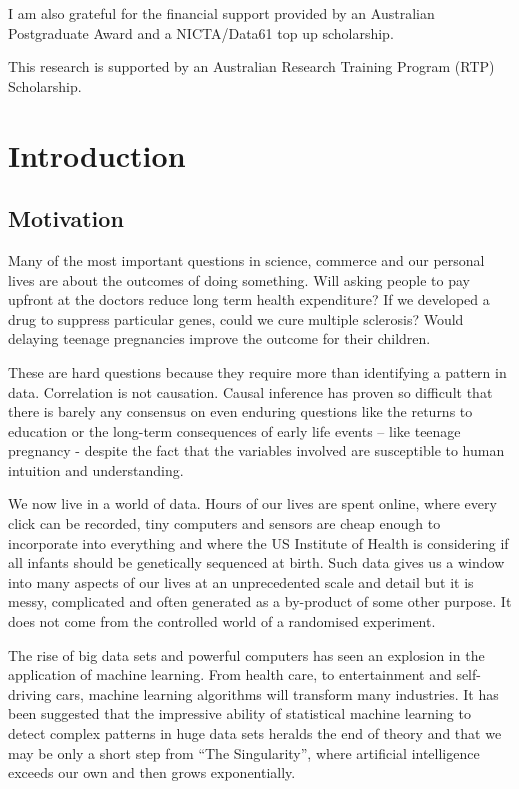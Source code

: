 \documentclass[11pt,a4paper,twoside]{report}
\newcommand{\quotes}[1]{``#1''}
\theoremstyle{plain}
\theoremstyle{definition}
\begin{document}
I am also grateful for the financial support provided by an Australian Postgraduate Award and a NICTA/Data61 top up scholarship. 

This research is supported by an Australian Research Training Program (RTP) Scholarship.

\onehalfspacing
 


\tableofcontents


\chapter{Introduction}

\section{Motivation}
Many of the most important questions in science, commerce and our personal lives are about the outcomes of doing something. Will asking people to pay upfront at the doctors reduce long term health expenditure? If we developed a drug to suppress particular genes, could we cure multiple sclerosis? Would delaying teenage pregnancies improve the outcome for their children.  

These are hard questions because they require more than identifying a pattern in data. Correlation is not causation. Causal inference has proven so difficult that there is barely any consensus on even enduring questions like the returns to education or the long-term consequences of early life events – like teenage pregnancy - despite the fact that the variables involved are susceptible to human intuition and understanding. 

We now live in a world of data. Hours of our lives are spent online, where every click can be recorded, tiny computers and sensors are cheap enough to incorporate into everything and where the US Institute of Health is considering if all infants should be genetically sequenced at birth. Such data gives us a window into many aspects of our lives at an unprecedented scale and detail but it is messy, complicated and often generated as a by-product of some other purpose. It does not come from the controlled world of a randomised experiment.

The rise of big data sets and powerful computers has seen an explosion in the application of machine learning. From health care, to entertainment and self-driving cars, machine learning algorithms will transform many industries. It has been suggested that the impressive ability of statistical machine learning to detect complex patterns in huge data sets heralds the end of theory \citep{anderson2008end} and that we may be only a short step from \quotes{The Singularity}, where artificial intelligence exceeds our own and then grows exponentially. 
\end{document}

